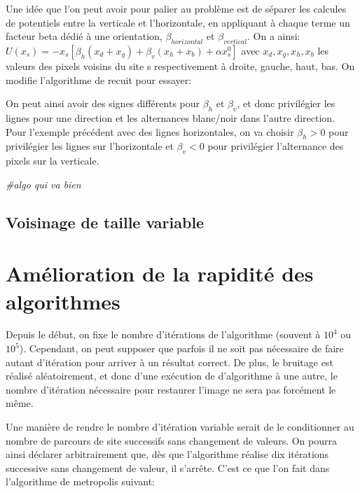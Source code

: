 \documentclass[
]{article}
\newenvironment{Shaded}{\begin{snugshade}}{\end{snugshade}}
\newcommand{\CommentTok}[1]{\textcolor[rgb]{0.56,0.35,0.01}{\textit{#1}}}
\begin{document}
Une idée que l'on peut avoir pour palier au problème est de séparer les
calcules de potentiels entre la verticale et l'horizontale, en
appliquant à chaque terme un facteur beta dédié à une orientation,
\(\beta_{horizontal}\) et \(\beta_{vertical}\). On a ainsi:
\(U(x_s)= -x_s[\beta_h(x_d+x_g)+\beta_v(x_h+x_b)+\alpha x_s^0]\) avec
\(x_d,x_g,x_h,x_b\) les valeurs des pixels voisins du site s
respectivement à droite, gauche, haut, bas. On modifie l'algorithme de
recuit pour essayer:

On peut ainsi avoir des signes différents pour \(\beta_h\) et
\(\beta_v\), et donc privilégier les lignes pour une direction et les
alternances blanc/noir dans l'autre direction. Pour l'exemple précédent
avec des lignes horizontales, on va choisir \(\beta_h > 0\) pour
privilégier les lignes sur l'horizontale et \(\beta_v < 0\) pour
privilégier l'alternance des pixels sur la verticale.

\begin{Shaded}
\begin{Highlighting}[]
\CommentTok{\#algo qui va bien}
\end{Highlighting}
\end{Shaded}

\hypertarget{voisinage-de-taille-variable}{%
\subsection{Voisinage de taille
variable}\label{voisinage-de-taille-variable}}

\hypertarget{amuxe9lioration-de-la-rapidituxe9-des-algorithmes}{%
\section{Amélioration de la rapidité des
algorithmes}\label{amuxe9lioration-de-la-rapidituxe9-des-algorithmes}}

Depuis le début, on fixe le nombre d'itérations de l'algorithme (souvent
à \(10^4\) ou \(10^5\)). Cependant, on peut supposer que parfois il ne
soit pas nécessaire de faire autant d'itération pour arriver à un
résultat correct. De plus, le bruitage est réalisé aléatoirement, et
donc d'une exécution de d'algorithme à une autre, le nombre d'itération
nécessaire pour restaurer l'image ne sera pas forcément le même.

Une manière de rendre le nombre d'itération variable serait de le
conditionner au nombre de parcours de site successifs sans changement de
valeurs. On pourra ainsi déclarer arbitrairement que, dès que
l'algorithme réalise dix itérations successive sans changement de
valeur, il s'arrête. C'est ce que l'on fait dans l'algorithme de
metropolis suivant:
\end{document}

